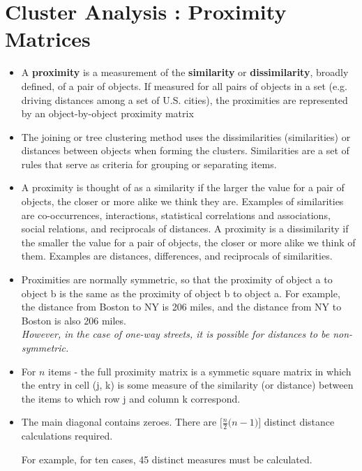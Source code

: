 \documentclass[a4paper,12pt]{report}
\begin{document}
\section{Cluster Analysis : Proximity Matrices}
\begin{itemize}
\item A \textbf{proximity} is a measurement of the \textbf{similarity} or \textbf{dissimilarity}, broadly defined, of a pair of objects. If measured for all pairs of objects in a set (e.g. driving distances among a set of U.S. cities), the proximities are represented by an object-by-object proximity matrix

\item 
The joining or tree clustering method uses the dissimilarities (similarities) or distances between objects when forming the clusters. Similarities are a set of rules that serve as criteria for grouping or separating items. 

\item A proximity is thought of as a similarity if the larger the value for a pair of objects, the closer or more alike we think they are. Examples of similarities are co-occurrences, interactions, statistical correlations and associations, social relations, and reciprocals of distances. A proximity is a dissimilarity if the smaller the value for a pair of objects, the closer or more alike we think of them. Examples are distances, differences, and reciprocals of similarities. 

\item Proximities are normally symmetric, so that the proximity of object a to object b is the same as the proximity of object b to object a. For example, the distance from Boston to NY is 206 miles, and the distance from NY to Boston is also 206 miles.\\ \textit{However, in the case of one-way streets, it is possible for distances to be non-symmetric.} 



\item For $n$ items - the full proximity matrix is a symmetic square matrix in which the entry in cell (j, k) is some measure of the similarity (or distance) between the items to which row j and column k correspond.

\item The main diagonal contains zeroes. There are $\displaystyle \bigg[ \frac{n}{2} \bigg( n-1 \bigg) \bigg]$ distinct distance calculations required.

For example, for ten cases, 45 distinct measures must be calculated.
\end{itemize}
\smallskip
\end{document}
